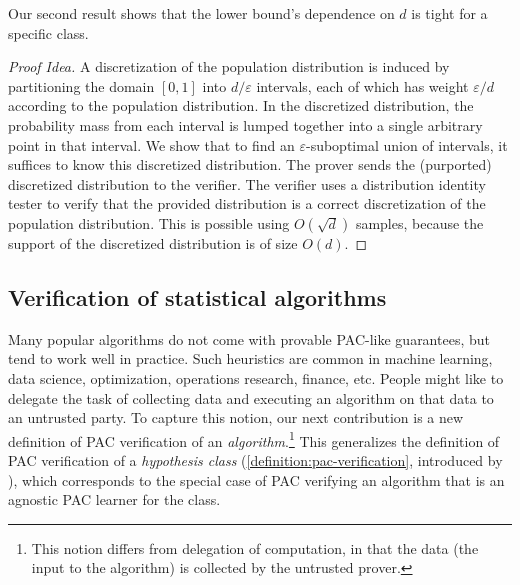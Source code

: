 \documentclass[11pt]{article}
\numberwithin{equation}{section}
\newtheorem{theorem}{Theorem}[section]
\theoremstyle{definition}
\theoremstyle{plain}
\theoremstyle{definition}\newtheorem{notation}[theorem]{Notation}\theoremstyle{plain}\raggedbottom
\newcommand{\roundBrackets}[1]{
	\mathopen{}\left(#1\right)\mathclose{}
}
\newcommand{\BigO}[1]{O\roundBrackets{#1}}
\newcommand{\bbN}{\mathbb{N}}
\newcommand{\cH}{\mathcal{H}}
\newcommand{\1}{\mathds{1}}
\newcommand{\mP}{m_{\scriptscriptstyle P}}
\newcommand{\mV}{m_{\scriptscriptstyle V}}
\begin{document}
Our second result shows that the lower bound's dependence on $d$ is tight for a specific class.


\begin{proof}[Proof Idea]
	A discretization of the population distribution is induced by partitioning the domain $[0,1]$ into $d/\varepsilon$ intervals, each of which has weight $\varepsilon/d$ according to the population distribution. In the discretized distribution, the probability mass from each interval is lumped together into a single arbitrary point in that interval. We show that to find an $\varepsilon$-suboptimal union of intervals, it suffices to know this discretized distribution. The prover sends the (purported) discretized distribution to the verifier. The verifier uses a distribution identity tester to verify that the provided distribution is a correct discretization of the population distribution. This is possible using $\BigO{\sqrt{d}}$ samples, because the support of the discretized distribution is of size $\BigO{d}$.
\end{proof} 

\subsection{Verification of statistical algorithms}\label{section:verification-of-statistical-algorithm}

Many popular algorithms do not come with provable PAC-like guarantees, but tend to work well in practice. Such heuristics are common in machine learning, data science, optimization, operations research, finance, etc. People might like to delegate the task of collecting data and executing an algorithm on that data to an untrusted party.
To capture this notion, our next contribution is a new definition of PAC verification of an \emph{algorithm}.\footnote{This notion differs from delegation of computation, in that the data (the input to the algorithm) is collected by the untrusted prover.}
This generalizes the definition of PAC verification of a \emph{hypothesis class} (\cref{definition:pac-verification}, introduced by \cite{GoldwasserRSY21}), which corresponds to the special case of PAC verifying an algorithm that is an agnostic PAC learner for the class.
\end{document}
